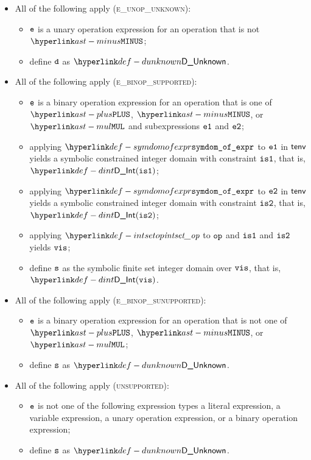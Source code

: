 \begin{itemize}
  \item All of the following apply (\textsc{e\_unop\_unknown}):
  \begin{itemize}
    \item $\texttt{e}$ is a unary operation expression for an operation that is not $\MINUS$;
    \item define $\texttt{d}$ as $\DUnknown$.
  \end{itemize}

  \item All of the following apply (\textsc{e\_binop\_supported}):
  \begin{itemize}
    \item $\texttt{e}$ is a binary operation expression for an operation that is one of $\PLUS$, $\MINUS$, or $\MUL$
          and subexpressions $\texttt{e1}$ and $\texttt{e2}$;
    \item applying $\symdomofexpr$ to $\texttt{e1}$ in $\textsf{tenv}$ yields a symbolic constrained integer domain with constraint $\texttt{is1}$,
          that is, $\DInt(\visone)$;
    \item applying $\symdomofexpr$ to $\texttt{e2}$ in $\textsf{tenv}$ yields a symbolic constrained integer domain with constraint $\texttt{is2}$,
          that is, $\DInt(\vistwo)$;
    \item applying $\intsetop$ to $\texttt{op}$ and $\texttt{is1}$ and $\texttt{is2}$ yields $\texttt{vis}$;
    \item define $\texttt{s}$ as the symbolic finite set integer domain over $\texttt{vis}$, that is, $\DInt(\vis)$.
  \end{itemize}

  \item All of the following apply (\textsc{e\_binop\_sunupported}):
  \begin{itemize}
    \item $\texttt{e}$ is a binary operation expression for an operation that is not one of $\PLUS$, $\MINUS$, or $\MUL$;
    \item define $\texttt{s}$ as $\DUnknown$.
  \end{itemize}

  \item All of the following apply (\textsc{unsupported}):
  \begin{itemize}
    \item $\texttt{e}$ is not one of the following expression types a literal expression, a variable expression, a unary operation
          expression, or a binary operation expression;
    \item define $\texttt{s}$ as $\DUnknown$.
  \end{itemize}
\end{itemize}

